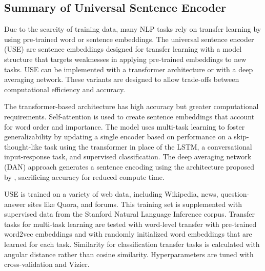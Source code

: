 

\subsection{Summary of Universal Sentence Encoder}

Due to the scarcity of training data, many NLP tasks rely on transfer learning by using pre-trained word or sentence embeddings. The universal sentence encoder (USE) \cite{use} are sentence embeddings designed for transfer learning with a model structure that targets weaknesses in applying pre-trained embeddings to new tasks. USE can be implemented with a transformer architecture or with a deep averaging network. These variants are designed to allow trade-offs between computational efficiency and accuracy. 

The transformer-based architecture has high accuracy but greater computational requirements. Self-attention \cite{attention} is used to create sentence embeddings that account for word order and importance. The model uses multi-task learning to foster generalizability by updating a single encoder based on performance on a skip-thought-like task using the transformer in place of the LSTM, a conversational input-response task, and supervised classification. The deep averaging network (DAN) approach generates a sentence encoding using the architecture proposed by \cite{dan}, sacrificing accuracy for reduced compute time.

USE is trained on a variety of web data, including Wikipedia, news, question-answer sites like Quora, and forums. This training set is supplemented with supervised data from the Stanford Natural Language Inference corpus. Transfer tasks for multi-task learning are tested with word-level transfer with pre-trained word2vec embeddings and with randomly initialized word embeddings that are learned for each task. Similarity for classification transfer tasks is calculated with angular distance rather than cosine similarity. Hyperparameters are tuned with cross-validation and Vizier. 

